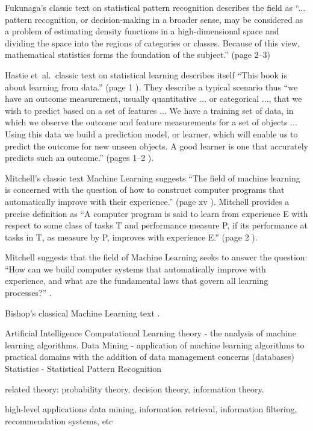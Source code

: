 \documentclass[a4paper, 11pt]{article}
\begin{document}
Fukunaga's classic text on statistical pattern recognition describes the field as ``... pattern recognition, or decision-making in a broader sense, may be considered as a problem of estimating density functions in a high-dimensional space and dividing the space into the regions of categories or classes. Because of this view, mathematical statistics forms the foundation of the subject.'' (page 2--3) \cite{Fukunaga1990}

Hastie et~al.\ classic text on statistical learning describes itself ``This book is about learning from data.'' (page 1 \cite{Hastie2009}). They describe a typical scenario thus ``we have an outcome measurement, usually quantitative ... or categorical ..., that we wish to predict based on a set of features ... We have a training set of data, in which we observe the outcome and feature measurements for a set of objects ... Using this data we build a prediction model, or learner, which will enable us to predict the outcome for new unseen objects. A good learner is one that accurately predicts such an outcome.'' (pages 1--2 \cite{Hastie2009}).

Mitchell's classic text Machine Learning suggests ``The field of machine learning is concerned with the question of how to construct computer programs that automatically improve with their experience.''  (page xv \cite{Mitchell1997}). Mitchell provides a precise definition as ``A computer program is said to learn from experience E with respect to some class of tasks T and performance measure P, if its performance at tasks in T, as measure by P, improves with experience E.'' (page 2 \cite{Mitchell1997}).

Mitchell suggests that the field of Machine Learning seeks to answer the question: ``How can we build computer systems that automatically improve with experience, and what are the fundamental laws that govern all learning processes?'' \cite{Mitchell2006}.

Bishop's classical Machine Learning text \cite{Bishop2006}.


Artificial Intelligence
Computational Learning theory - the analysis of machine learning algorithms.
Data Mining - application of machine learning algorithms to practical domains with the addition of data management concerns (databases)
Statistics  - 
Statistical Pattern Recognition

related theory: probability theory, decision theory, information theory. 

high-level applications
data mining, information retrieval, information filtering, recommendation systems, etc
\end{document}
